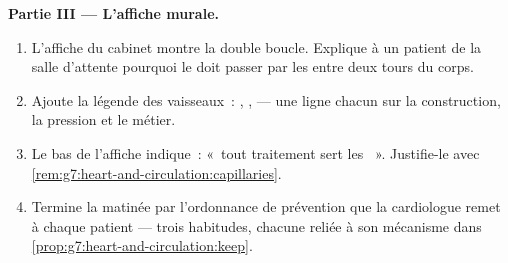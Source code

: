 \begin{problem}
\medskip\noindent\textbf{Partie III --- L'affiche murale.}
\begin{enumerate}[resume]
  \item L'affiche du cabinet montre la double boucle. Explique à un
        patient de la salle d'attente pourquoi le  doit passer
        par les  entre deux tours du corps.
  \item Ajoute la légende des vaisseaux~: , ,
         --- une ligne chacun sur la construction, la pression
        et le métier.
  \item Le bas de l'affiche indique~: «~tout traitement sert les
        ~». Justifie-le avec
        \cref{rem:g7:heart-and-circulation:capillaries}.
  \item Termine la matinée par l'ordonnance de prévention que la
        cardiologue remet à chaque patient --- trois habitudes,
        chacune reliée à son mécanisme dans
        \cref{prop:g7:heart-and-circulation:keep}.
\end{enumerate}
\end{problem}
